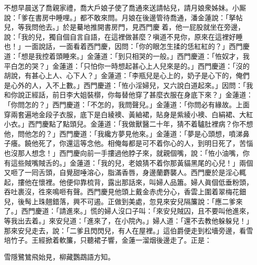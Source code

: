 不想早晨送了喬親家禮，喬大戶娘子使了喬通來送請帖兒，請月娘衆姊妹。小厮說：「爹在書房中睡哩。」都不敢來問。月娘在後邊管待喬通，潘金蓮說：「拏帖兒，等我問他去。」於是驀地推開書房門，見西門慶𢱉着，他一屁股就坐在旁邊，說：「我的兒，獨自個自言自語，在這裡做甚麼？嗔道不見你，原來在這裡好睡也！」一面說話，一面看着西門慶，因問：「你的眼怎生揉的恁紅紅的？」{}西門慶道：「想是我控着頭睡來。」金蓮道：「到只相哭的一般。」{}西門慶道：「恠奴才，我平白怎的哭？」金蓮道：「只怕你一時想起甚心上人兒來是的。」{}西門慶道：「沒的胡說，有甚心上人、心下人？」金蓮道：「李瓶兒是心上的，奶子是心下的，俺們是心外的人，入不上數。」西門慶道：「恠小淫婦兒，又六說白道起來。」因問：「我和你說正經話，前日李大姐裝槨，你每替他穿了甚麼衣服在身底下來？」金蓮道：「你問怎的？」西門慶道：「不怎的，我問聲兒。」金蓮道：「你問必有緣故。上面穿兩套遍地金段子衣服，底下是白綾襖、黃紬裙，貼身是紫綾小襖、白絹裙、大紅小衣。」西門慶點了點頭兒。金蓮道：「我做獸醫二十年，猜不着驢肚裡病？你不想他，問他怎的？」西門慶道：「我纔方夢見他來。」{}金蓮道：「夢是心頭想，噴涕鼻子癢。{}饒他死了，你還這等念他。相俺每都是可不着你心的人，到明日死了，苦惱也沒那人想念！」西門慶向前一手摟過他脖子來，就親個嘴，說：「恠小油嘴，你有這些賊嘴賊舌的。」金蓮道：「我的兒，老娘猜不着你那黃貓黑尾的心兒！」兩個又咂了一囘舌頭，自覺甜唾溶心，脂滿香唇，身邊蘭麝襲人。西門慶於是淫心輒起，摟他在懷裡。他便仰靠梳背，露出那話來，叫婦人品簫。婦人眞個低垂粉頭，吞吐裹沒，徃來鳴咂有聲。西門慶見他頭上戴金赤虎分心，香雲上圍着翠梅花鈿兒，後髩上珠翹錯落，興不可遏。{}正做到美處，忽見來安兒隔簾說：「應二爹來了。」西門慶道：「請進來。」慌的婦人沒口子叫：「來安兒賊囚，且不要叫他進來，等我出去着。」來安兒道：「進來了，在小院內。」婦人道：「還不去教他躲躲兒！」那來安兒走去，說：「二爹且閃閃兒，有人在屋裡。」這伯爵便走到松墻旁邊，看雪培竹子。王經掀着軟簾，只聽裙子響，金蓮一溜烟後邊走了。正是：

\begin{myquote} 
雪隱鷺鷥飛始見，柳藏鸚鵡語方知。
\end{myquote} 


